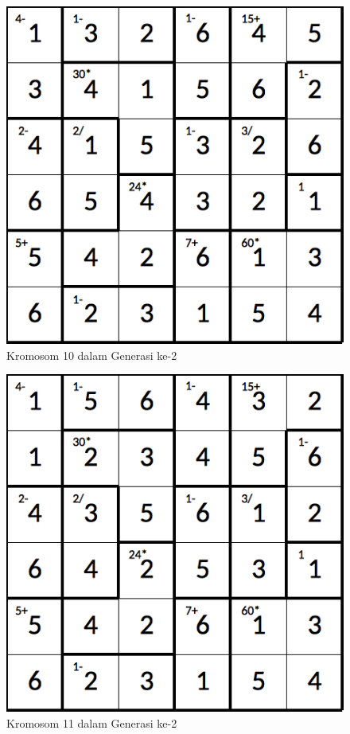 \documentclass[a4paper,twoside]{article}
\begin{document}
\begin{enumerate}
\begin{figure}
\centering
\captionsetup{justification=centering}
\includegraphics[scale=0.333]{Gambar/hybridgenetic/Generation2Chromosome10}
\caption[Kromosom 10 dalam Generasi ke-2]{Kromosom 10 dalam Generasi ke-2}
\label{fig:analisisg2k10}
\end{figure}

\begin{figure}
\centering
\captionsetup{justification=centering}
\includegraphics[scale=0.333]{Gambar/hybridgenetic/Generation2Chromosome11}
\caption[Kromosom 11 dalam Generasi ke-2]{Kromosom 11 dalam Generasi ke-2}
\label{fig:analisisg2k11}
\end{figure}


\end{enumerate}
\end{document}
